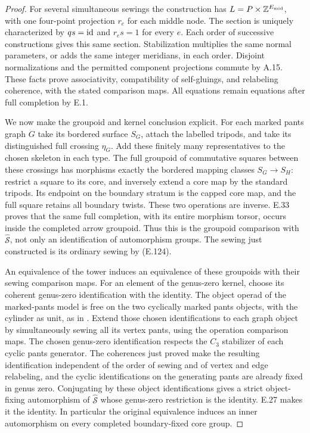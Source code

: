 \begin{proof}
For several simultaneous sewings the construction
has
$L=P\times\mathbb Z^{E_{\mathrm{mid}}}$, with one
four-point projection $r_e$ for each middle node.
The section is uniquely characterized by $q s=\mathrm{id}$
and $r_e s=1$ for every $e$.  Each order of
successive constructions gives this same section.
Stabilization multiplies the same normal parameters,
or adds the same integer meridians, in each order.
Disjoint normalizations and the permitted component
projections commute by A.15.  These facts prove
associativity, compatibility of self-gluings, and
relabeling coherence, with the stated comparison
maps.  All equations remain equations after full
completion by E.1.

We now make the groupoid and kernel conclusion
explicit.  For each marked pants graph $G$ take
its bordered surface $S_G$, attach the labelled
tripods, and take its distinguished full crossing
$\eta_G$.  Add these finitely many representatives
to the chosen skeleton in each type.  The full
groupoid of commutative squares between these
crossings has morphisms exactly the bordered
mapping classes $S_G\to S_H$: restrict a square
to its core, and inversely extend a core map by
the standard tripods.  Its endpoint on the
boundary stratum is the capped core map, and
the full square retains all boundary twists.
These two operations are inverse.  E.33 proves
that the same full completion, with its entire
morphism torsor, occurs inside the completed
arrow groupoid.  Thus this is the groupoid
comparison with $\widehat{\mathcal S}$, not only
an identification of automorphism groups.
The sewing just constructed is its ordinary
sewing by (E.124).

An equivalence of the tower induces an equivalence
of these groupoids with their sewing comparison
maps.  For an element of the genus-zero kernel,
choose its coherent genus-zero identification
with the identity.  The object operad of the
marked-pants model is free on the two cyclically
marked pants objects, with the cylinder as unit,
as in \cite[Definition 3.1]{ET_BonattoRobertson2026}.
Extend those chosen identifications to each
graph object by simultaneously sewing all its vertex pants,
using the operation comparison maps.  The chosen genus-zero
identification respects the $C_3$ stabilizer of each cyclic
pants generator.  The
coherences just proved make the resulting
identification independent of the order of
sewing and of vertex and edge relabeling, and the cyclic identifications on the
generating pants are already fixed in genus
zero.  Conjugating by these object identifications
gives a strict object-fixing automorphism of
$\widehat{\mathcal S}$ whose genus-zero restriction
is the identity.  E.27 makes it the identity.
In particular the original equivalence induces
an inner automorphism on every completed
boundary-fixed core group.


\end{proof}
